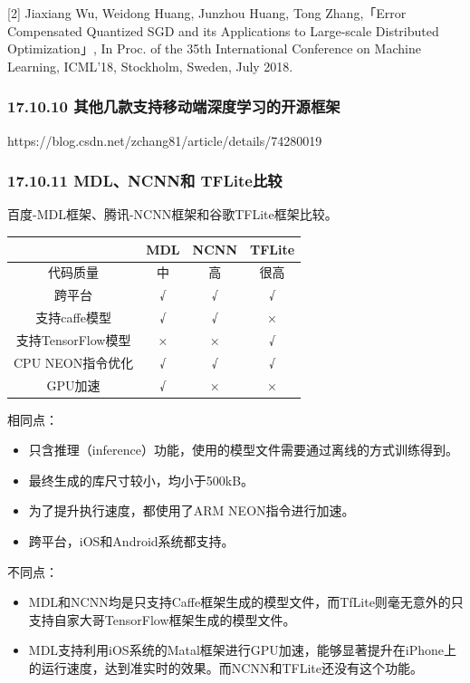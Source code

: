 {[}2{]} Jiaxiang Wu, Weidong Huang, Junzhou Huang, Tong Zhang,「Error
Compensated Quantized SGD and its Applications to Large-scale
Distributed Optimization」, In Proc. of the 35th International
Conference on Machine Learning, ICML'18, Stockholm, Sweden, July 2018.

\subsubsection{17.10.10
其他几款支持移动端深度学习的开源框架}\label{ux5176ux4ed6ux51e0ux6b3eux652fux6301ux79fbux52a8ux7aefux6df1ux5ea6ux5b66ux4e60ux7684ux5f00ux6e90ux6846ux67b6}

https://blog.csdn.net/zchang81/article/details/74280019

\subsubsection{17.10.11 MDL、NCNN和
TFLite比较}\label{mdlncnnux548c-tfliteux6bd4ux8f83}

百度-MDL框架、腾讯-NCNN框架和谷歌TFLite框架比较。

\begin{longtable}[]{ cccc }
\toprule
& MDL & NCNN & TFLite\tabularnewline
\midrule
\endhead
代码质量 & 中 & 高 & 很高\tabularnewline
跨平台 & √ & √ & √\tabularnewline
支持caffe模型 & √ & √ & ×\tabularnewline
支持TensorFlow模型 & × & × & √\tabularnewline
CPU NEON指令优化 & √ & √ & √\tabularnewline
GPU加速 & √ & × & ×\tabularnewline
\bottomrule
\end{longtable}

相同点：

\begin{itemize}
\item
  只含推理（inference）功能，使用的模型文件需要通过离线的方式训练得到。
\item
  最终生成的库尺寸较小，均小于500kB。
\item
  为了提升执行速度，都使用了ARM NEON指令进行加速。
\item
  跨平台，iOS和Android系统都支持。
\end{itemize}

不同点：

\begin{itemize}
\item
  MDL和NCNN均是只支持Caffe框架生成的模型文件，而TfLite则毫无意外的只支持自家大哥TensorFlow框架生成的模型文件。
\item
  MDL支持利用iOS系统的Matal框架进行GPU加速，能够显著提升在iPhone上的运行速度，达到准实时的效果。而NCNN和TFLite还没有这个功能。
\end{itemize}

